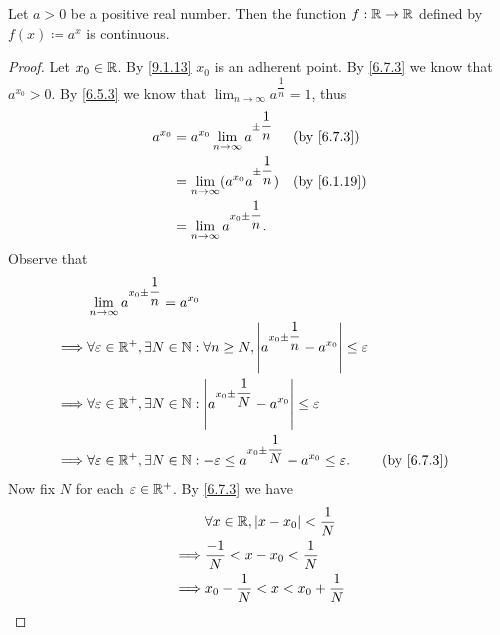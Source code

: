 \begin{prop}\label{9.4.10}
  Let \(a > 0\) be a positive real number.
  Then the function \(f : \mathbb{R} \to \mathbb{R}\) defined by \(f(x) \coloneqq a^x\) is continuous.
\end{prop}

\begin{proof}
  Let \(x_0 \in \mathbb{R}\).
  By \cref{9.1.13} \(x_0\) is an adherent point.
  By \cref{6.7.3} we know that \(a^{x_0} > 0\).
  By \cref{6.5.3} we know that \(\lim_{n \to \infty} a^{\dfrac{1}{n}} = 1\), thus
  \begin{align*}
    a^{x_0} & = a^{x_0} \lim_{n \to \infty} a^{\pm \dfrac{1}{n}}   &  & \by{6.7.3}  \\
            & = \lim_{n \to \infty} (a^{x_0} a^{\pm \dfrac{1}{n}}) &  & \by{6.1.19} \\
            & = \lim_{n \to \infty} a^{x_0 \pm \dfrac{1}{n}}.
  \end{align*}
  Observe that
  \begin{align*}
             & \lim_{n \to \infty} a^{x_0 \pm \dfrac{1}{n}} = a^{x_0}                                                                                       \\
    \implies & \forall \varepsilon \in \R^+, \exists N \in \N : \forall n \geq N, \abs{a^{x_0 \pm \dfrac{1}{n}} - a^{x_0}} \leq \varepsilon                 \\
    \implies & \forall \varepsilon \in \R^+, \exists N \in \N : \abs{a^{x_0 \pm \dfrac{1}{N}} - a^{x_0}} \leq \varepsilon                                   \\
    \implies & \forall \varepsilon \in \R^+, \exists N \in \N : -\varepsilon \leq a^{x_0 \pm \dfrac{1}{N}} - a^{x_0} \leq \varepsilon.      &  & \by{6.7.3}
  \end{align*}
  Now fix \(N\) for each \(\varepsilon \in \mathbb{R}^+\).
  By \cref{6.7.3} we have
  \begin{align*}
             & \forall x \in \R, \abs{x - x_0} < \dfrac{1}{N}                                                                                                             \\
    \implies & \dfrac{-1}{N} < x - x_0 < \dfrac{1}{N}                                                                                                                     \\
    \implies & x_0 - \dfrac{1}{N} < x < x_0 + \dfrac{1}{N}                                                                                                                \\

\end{align*}
\end{proof}
